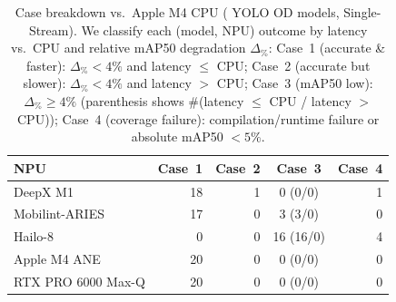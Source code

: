 \begin{table}[tb]
\caption{Case breakdown vs.\ Apple M4 CPU ( YOLO OD models, Single-Stream).
We classify each (model, NPU) outcome by latency vs.\ CPU and relative mAP50 degradation $\Delta_{\%}$:
Case~1 (accurate \& faster): $\Delta_{\%}<4\%$ and latency $\leq$ CPU;
Case~2 (accurate but slower): $\Delta_{\%}<4\%$ and latency $>$ CPU;
Case~3 (mAP50 low): $\Delta_{\%}\geq 4\%$ (parenthesis shows \#(latency $\leq$ CPU / latency $>$ CPU));
Case~4 (coverage failure): compilation/runtime failure or absolute mAP50 $<5\%$.}
\label{tab:case_breakdown_67}
\centering
\small
\setlength{\tabcolsep}{4pt} 
\begin{tabular}{lrrcr}
\toprule
NPU & Case~1 & Case~2 & Case~3 & Case~4 \\
\midrule
DeepX M1 & 18 & 1 & 0 (0/0) & 1 \\
Mobilint-ARIES & 17 & 0 & 3 (3/0) & 0 \\
Hailo-8 & 0 & 0 & 16 (16/0) & 4 \\
Apple M4 ANE & 20 & 0 & 0 (0/0) & 0 \\
RTX PRO 6000 Max-Q & 20 & 0 & 0 (0/0) & 0 \\
\bottomrule
\end{tabular}
\end{table}


%
